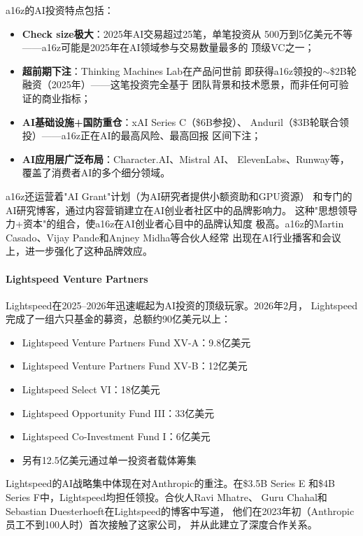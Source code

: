 a16z的AI投资特点包括：
\begin{itemize}
  \item \textbf{Check size极大}：2025年AI交易超过25笔，单笔投资从
    500万到5亿美元不等——a16z可能是2025年在AI领域参与交易数量最多的
    顶级VC之一；
  \item \textbf{超前期下注}：Thinking Machines Lab在产品问世前
    即获得a16z领投的$\sim$\$2B轮融资（2025年）——这笔投资完全基于
    团队背景和技术愿景，而非任何可验证的商业指标；
  \item \textbf{AI基础设施+国防重仓}：xAI Series C（\$6B参投）、
    Anduril（\$3B轮联合领投）——a16z正在AI的最高风险、最高回报
    区间下注；
  \item \textbf{AI应用层广泛布局}：Character.AI、Mistral AI、
    ElevenLabs、Runway等，覆盖了消费者AI的多个细分领域。
\end{itemize}

a16z还运营着"AI Grant"计划（为AI研究者提供小额资助和GPU资源）
和专门的AI研究博客，通过内容营销建立在AI创业者社区中的品牌影响力。
这种"思想领导力+资本"的组合，使a16z在AI创业者心目中的品牌认知度
极高。a16z的Martin Casado、Vijay Pande和Anjney Midha等合伙人经常
出现在AI行业播客和会议上，进一步强化了这种品牌效应。

\paragraph{Lightspeed Venture Partners}

Lightspeed在2025--2026年迅速崛起为AI投资的顶级玩家。2026年2月，
Lightspeed完成了一组六只基金的募资，总额约90亿美元以上：
\begin{itemize}
  \item Lightspeed Venture Partners Fund XV-A：9.8亿美元
  \item Lightspeed Venture Partners Fund XV-B：12亿美元
  \item Lightspeed Select VI：18亿美元
  \item Lightspeed Opportunity Fund III：33亿美元
  \item Lightspeed Co-Investment Fund I：6亿美元
  \item 另有12.5亿美元通过单一投资者载体筹集
\end{itemize}

Lightspeed的AI战略集中体现在对Anthropic的重注。在\$3.5B Series E
和\$4B Series F中，Lightspeed均担任领投。合伙人Ravi Mhatre、
Guru Chahal和Sebastian Duesterhoeft在Lightspeed的博客中写道，
他们在2023年初（Anthropic员工不到100人时）首次接触了这家公司，
并从此建立了深度合作关系。

